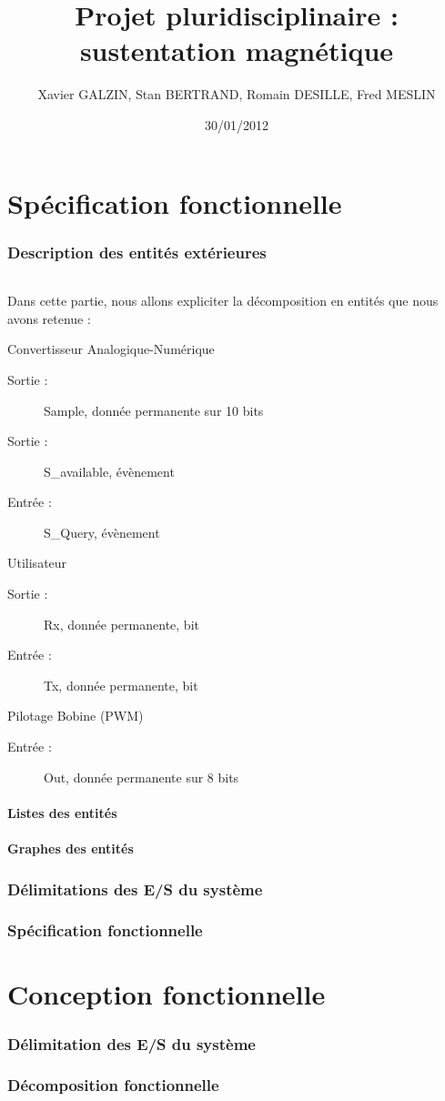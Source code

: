 \documentclass[11pt, french]{article} %
\title{Projet pluridisciplinaire : sustentation magnétique}
\author{ Xavier GALZIN, Stan BERTRAND, Romain DESILLE, Fred MESLIN}
\date{30/01/2012}
\begin{document}
\maketitle
\pagebreak


\part{Spécification fonctionnelle}

\section{Description des entités extérieures}
\paragraph{} Dans cette partie, nous allons expliciter la décomposition en entités que nous avons retenue :

Convertisseur Analogique-Numérique
\begin{description}
\item[Sortie : ]Sample, donnée permanente sur 10 bits
\item[Sortie : ]S_available, évènement
\item[Entrée : ]S_Query, évènement
\end{description}

Utilisateur
\begin{description}
\item[Sortie : ]Rx, donnée permanente, bit
\item[Entrée : ]Tx, donnée permanente, bit
\end{description}

Pilotage Bobine (PWM)
\begin{description}
\item[Entrée : ]Out, donnée permanente sur 8 bits
\end{description}



\subsection{Listes des entités}
\subsection{Graphes des entités}
\section{Délimitations des E/S du système}
\section{Spécification fonctionnelle}



\part{Conception fonctionnelle}
\section{Délimitation des E/S du système}
\section{Décomposition fonctionnelle}







\end{document}

